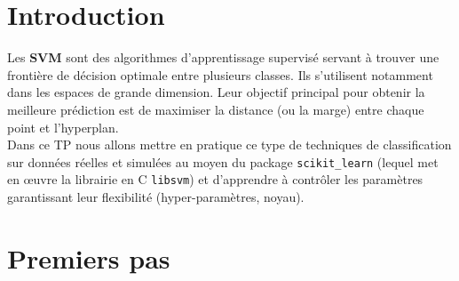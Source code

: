 \documentclass[11pt,a4paper]{article}
\begin{document}
\section*{Introduction}
Les \textbf{SVM} sont des algorithmes d'apprentissage supervisé servant à trouver une frontière de décision optimale entre plusieurs classes. Ils s'utilisent notamment dans les espaces de grande dimension. Leur objectif principal pour obtenir la meilleure prédiction est de maximiser la distance (ou la marge) entre chaque point et l'hyperplan. \\
Dans ce TP nous allons mettre en pratique ce type de techniques de classification sur données réelles et simulées au moyen du package \texttt{scikit\_learn} (lequel met en œuvre la librairie en C \texttt{libsvm}) et d’apprendre à contrôler les paramètres garantissant leur flexibilité (hyper-paramètres, noyau).\\

\section*{Premiers pas}
\end{document}
